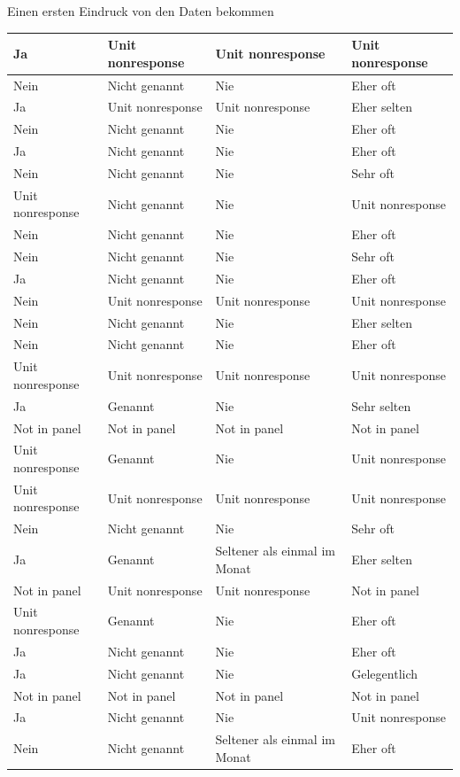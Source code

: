\documentclass[ignorenonframetext,]{beamer}
\begin{document}
\begin{frame}{Einen ersten Eindruck von den Daten bekommen}
\begin{tabular}{l|l|l|l}
\hline
Ja & Unit nonresponse & Unit nonresponse & Unit nonresponse\\
\hline
Nein & Nicht genannt & Nie & Eher oft\\
\hline
Ja & Unit nonresponse & Unit nonresponse & Eher selten\\
\hline
Nein & Nicht genannt & Nie & Eher oft\\
\hline
Ja & Nicht genannt & Nie & Eher oft\\
\hline
Nein & Nicht genannt & Nie & Sehr oft\\
\hline
Unit nonresponse & Nicht genannt & Nie & Unit nonresponse\\
\hline
Nein & Nicht genannt & Nie & Eher oft\\
\hline
Nein & Nicht genannt & Nie & Sehr oft\\
\hline
Ja & Nicht genannt & Nie & Eher oft\\
\hline
Nein & Unit nonresponse & Unit nonresponse & Unit nonresponse\\
\hline
Nein & Nicht genannt & Nie & Eher selten\\
\hline
Nein & Nicht genannt & Nie & Eher oft\\
\hline
Unit nonresponse & Unit nonresponse & Unit nonresponse & Unit nonresponse\\
\hline
Ja & Genannt & Nie & Sehr selten\\
\hline
Not in panel & Not in panel & Not in panel & Not in panel\\
\hline
Unit nonresponse & Genannt & Nie & Unit nonresponse\\
\hline
Unit nonresponse & Unit nonresponse & Unit nonresponse & Unit nonresponse\\
\hline
Nein & Nicht genannt & Nie & Sehr oft\\
\hline
Ja & Genannt & Seltener als einmal im Monat & Eher selten\\
\hline
Not in panel & Unit nonresponse & Unit nonresponse & Not in panel\\
\hline
Unit nonresponse & Genannt & Nie & Eher oft\\
\hline
Ja & Nicht genannt & Nie & Eher oft\\
\hline
Ja & Nicht genannt & Nie & Gelegentlich\\
\hline
Not in panel & Not in panel & Not in panel & Not in panel\\
\hline
Ja & Nicht genannt & Nie & Unit nonresponse\\
\hline
Nein & Nicht genannt & Seltener als einmal im Monat & Eher oft\\

\end{tabular}
\end{frame}
\end{document}
